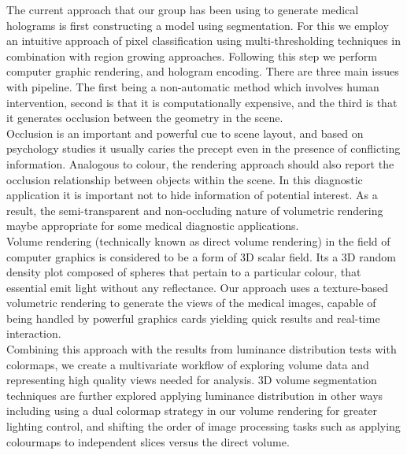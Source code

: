 The current approach that our group has been using to generate medical holograms is first constructing a model using segmentation. For this we employ an intuitive approach of pixel classification using multi-thresholding  techniques in combination with region growing approaches.  Following this step we perform computer graphic rendering, and hologram encoding.  There are three main issues with pipeline.  The first being a non-automatic method which involves human intervention, second is that it is computationally expensive, and the third is that it generates occlusion between the geometry in the scene.\\

Occlusion is an important and powerful cue to scene layout, and based on psychology studies it usually caries the precept even in the presence of conflicting information.  Analogous to colour, the rendering approach should also report the occlusion relationship between objects within the scene. In this diagnostic application it is important not to hide information of potential interest.  As a result, the semi-transparent and non-occluding nature of volumetric rendering maybe appropriate for some medical diagnostic applications.\\

Volume rendering (technically known as direct volume rendering) in the field of computer graphics is considered to be a form of 3D scalar field.  Its a 3D random density plot composed of spheres that pertain to a particular colour, that essential emit light without any reflectance.  Our approach uses a texture-based volumetric rendering to generate the views of the medical images, capable of being handled by powerful graphics cards yielding quick results and real-time interaction.\\

Combining this approach with the results from luminance distribution tests with colormaps, we create a multivariate workflow of exploring volume data and representing high quality views needed for analysis.  3D volume segmentation techniques are further explored applying luminance distribution in other ways including using a dual colormap strategy in our volume rendering for greater lighting control, and shifting the order of image processing tasks such as applying colourmaps to independent slices versus the direct volume.\\
